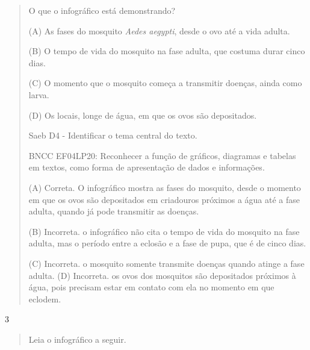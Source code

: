 \begin{itemize}
{{{\begin{itemize}
\begin{itemize}
\begin{itemize}
\begin{quote}
\protect\hypertarget{_Hlk128465624}{}{}O que o infográfico está
demonstrando?

(A) As fases do mosquito \emph{Aedes aegypti}, desde o ovo até a vida
adulta.

(B) O tempo de vida do mosquito na fase adulta, que costuma durar cinco
dias.

(C) O momento que o mosquito começa a transmitir doenças, ainda como
larva.

(D) Os locais, longe de água, em que os ovos são depositados.

Saeb D4 - Identificar o tema central do texto.

BNCC EF04LP20: Reconhecer a função de gráficos, diagramas e tabelas em
textos, como forma de apresentação de dados e informações.

(A) Correta. O infográfico mostra as fases do mosquito, desde o momento
em que os ovos são depositados em criadouros próximos a água até a fase
adulta, quando já pode transmitir as doenças.

(B) Incorreta. o infográfico não cita o tempo de vida do mosquito na
fase adulta, mas o período entre a eclosão e a fase de pupa, que é de
cinco dias.

(C) Incorreta. o mosquito somente transmite doenças quando atinge a fase
adulta. (D) Incorreta. os ovos dos mosquitos são depositados próximos à
água, pois precisam estar em contato com ela no momento em que eclodem.
\end{quote}

\num{3}

\begin{quote}
Leia o infográfico a seguir.


\end{quote}
\end{itemize}
\end{itemize}
\end{itemize}}}}
\end{itemize}
